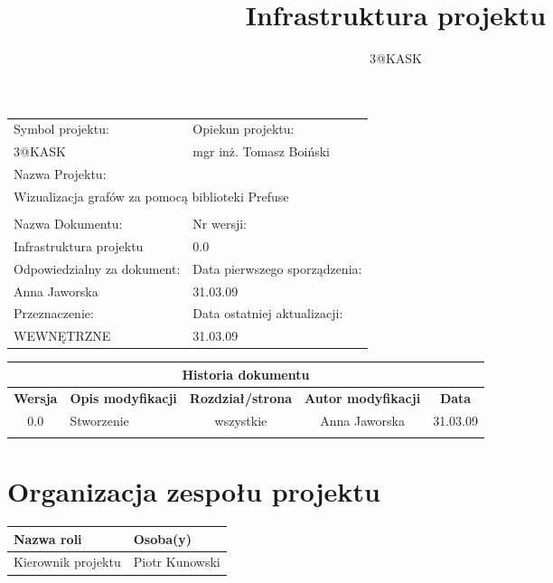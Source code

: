 \documentclass[a4paper,10pt]{article}
\title{Infrastruktura projektu}
\author{3@KASK}
\begin{document}



\maketitle


\begin{center}
\begin{tabular}{|p{7cm}|p{7cm}|}
\hline
Symbol projektu: & Opiekun projektu:   \tabularnewline 
3@KASK & mgr inż. Tomasz Boiński    \tabularnewline \hline
\multicolumn{2}{|l|}{Nazwa Projektu: } \tabularnewline
\multicolumn{2}{|l|}{Wizualizacja grafów za pomocą biblioteki Prefuse } \tabularnewline 
\hline
\multicolumn{2}{l}{ } \tabularnewline %
\hline 
Nazwa Dokumentu: & Nr wersji:   \tabularnewline 
Infrastruktura projektu & 0.0 \tabularnewline \hline
Odpowiedzialny za dokument: & Data pierwszego sporządzenia:   \tabularnewline 
Anna Jaworska  & 31.03.09 \tabularnewline \hline
Przeznaczenie: & Data ostatniej aktualizacji:   \tabularnewline 
WEWNĘTRZNE & 31.03.09 \tabularnewline \hline
\end{tabular}
\end{center}

\begin{center}
\begin{tabular}{|c|p{4cm}|c|c|c|}
\multicolumn{5}{c}{\textbf{Historia dokumentu}} \tabularnewline \hline
\textbf{Wersja} & \textbf{Opis modyfikacji} & \textbf{Rozdział/strona} & \textbf{Autor modyfikacji} & \textbf{Data} \tabularnewline \hline 
0.0 & Stworzenie & wszystkie & Anna Jaworska & 31.03.09 \tabularnewline \hline
& & & &\tabularnewline \hline
\end{tabular}
 

\end{center}


\newpage
\tableofcontents
\newpage

\section{Organizacja zespołu projektu}
\begin{center}
\begin{tabular}{|l|l|} \hline
	Nazwa roli & Osoba(y) \tabularnewline \hline
	Kierownik projektu & Piotr Kunowski \tabularnewline \hline
\end{tabular}
\end{center}

\end{document}
